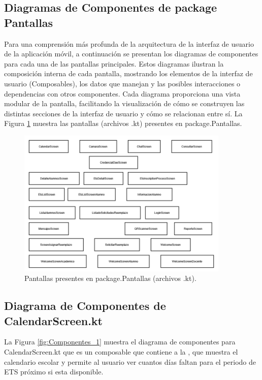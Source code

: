 \subsection{Diagramas de Componentes de package Pantallas}

Para una comprensión más profunda de la arquitectura de la interfaz de usuario de la aplicación móvil, a continuación se presentan los diagramas de componentes para cada una de las pantallas principales. Estos diagramas ilustran la composición interna de cada pantalla, mostrando los elementos de la interfaz de usuario (Composables), los datos que manejan y las posibles interacciones o dependencias con otros componentes. Cada diagrama proporciona una vista modular de la pantalla, facilitando la visualización de cómo se construyen las distintas secciones de la interfaz de usuario y cómo se relacionan entre sí. La Figura \ref{fig:Pantallas} muestra las pantallas (archivos .kt) presentes en package.Pantallas.

\begin{figure}[htbp!]
	\begin{center}
		\includegraphics[width=0.9\textwidth]{DiagramasMoviles/DCM (12)}
		\caption{Pantallas presentes en package.Pantallas (archivos .kt).}
		\label{fig:Pantallas}
	\end{center}
\end{figure}


\newpage

\subsection{Diagrama de Componentes de CalendarScreen.kt}

La Figura \ref{fig:Componentes_1} muestra el diagrama de componentes para CalendarScreen.kt que es un composable que contiene a la , que muestra el calendario escolar y permite al usuario ver cuantos días faltan para el periodo de ETS próximo si esta disponible.

